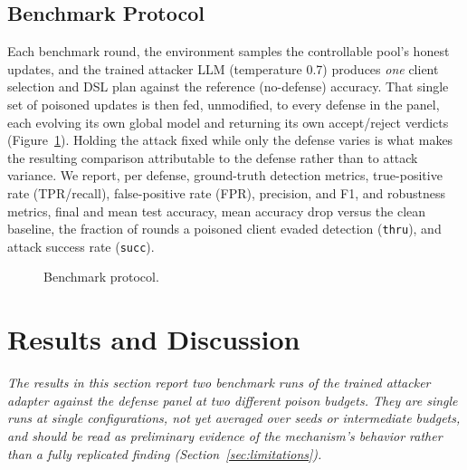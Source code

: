 \documentclass[conference,9pt]{IEEEtran}
\begin{document}
\subsection{Benchmark Protocol}
\label{sec:benchmark-protocol}
Each benchmark round, the environment samples the controllable pool's honest updates, and the trained attacker LLM (temperature 0.7) produces \emph{one} client selection and DSL plan against the reference (no-defense) accuracy. That single set of poisoned updates is then fed, unmodified, to every defense in the panel, each evolving its own global model and returning its own accept/reject verdicts (Figure~\ref{fig:benchmark}). Holding the attack fixed while only the defense varies is what makes the resulting comparison attributable to the defense rather than to attack variance. We report, per defense, ground-truth detection metrics, true-positive rate (TPR/recall), false-positive rate (FPR), precision, and F1, and robustness metrics, final and mean test accuracy, mean accuracy drop versus the clean baseline, the fraction of rounds a poisoned client evaded detection (\texttt{thru}), and attack success rate (\texttt{succ}).

\begin{figure}[!h]
\centering
{}
\caption{Benchmark protocol.}
\label{fig:benchmark}
\end{figure}

\section{Results and Discussion}
\label{sec:results}

\textit{The results in this section report two benchmark runs of the trained attacker adapter against the defense panel at two different poison budgets. They are single runs at single configurations, not yet averaged over seeds or intermediate budgets, and should be read as preliminary evidence of the mechanism's behavior rather than a fully replicated finding (Section~\ref{sec:limitations}).}
\end{document}
